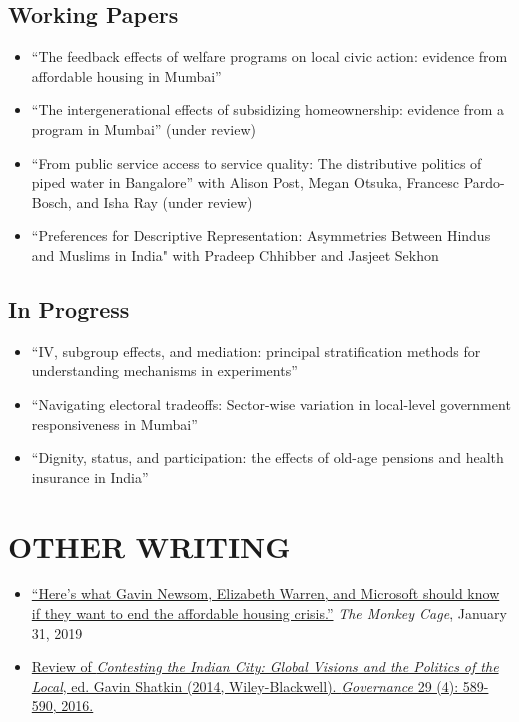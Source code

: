 \documentclass[11pt]{article}
\begin{document}
\subsection*{Working Papers}

\begin{itemize}
	\item[]``The feedback effects of welfare programs on local civic action: evidence from affordable housing in Mumbai'' 
	\item[]``The intergenerational effects of subsidizing homeownership: evidence from a program in Mumbai'' (under review)
		\item[]``From public service access to service quality: The distributive politics of piped water in Bangalore'' with Alison Post, Megan Otsuka, Francesc Pardo-Bosch, and Isha Ray (under review)
	
		\item[]``Preferences for Descriptive Representation: Asymmetries Between Hindus and Muslims in India" with Pradeep Chhibber and Jasjeet Sekhon 
		\end{itemize}

\subsection*{In Progress}
\begin{itemize}
	\item[]``IV, subgroup effects, and mediation: principal stratification methods for understanding mechanisms in experiments''  
	\item[]``Navigating electoral tradeoffs: Sector-wise variation in local-level government responsiveness in Mumbai''
	\item[]``Dignity, status, and participation: the effects of old-age pensions and health insurance in India''
	\end{itemize}
\vspace{3mm}
\section*{OTHER WRITING}
\begin{itemize}
\item[]\href{https://www.washingtonpost.com/news/monkey-cage/wp/2019/01/31/heres-what-gavin-newsom-elizabeth-warren-and-microsoft-should-know-if-want-to-end-the-affordable-housing-crisis/?tid=sm_tw_cage}{``Here's what Gavin Newsom, Elizabeth Warren, and Microsoft should know if they want to end the affordable housing crisis.''} \textit{The Monkey Cage}, January 31, 2019
\item[] \href{http://onlinelibrary.wiley.com/doi/10.1111/gove.12241/abstract}{Review of \textit{Contesting the Indian City: Global Visions and the Politics of the Local}, ed. Gavin Shatkin (2014, Wiley-Blackwell). \textit{Governance} 29 (4): 589-590, 2016.} \
\end{itemize}
\end{document}
